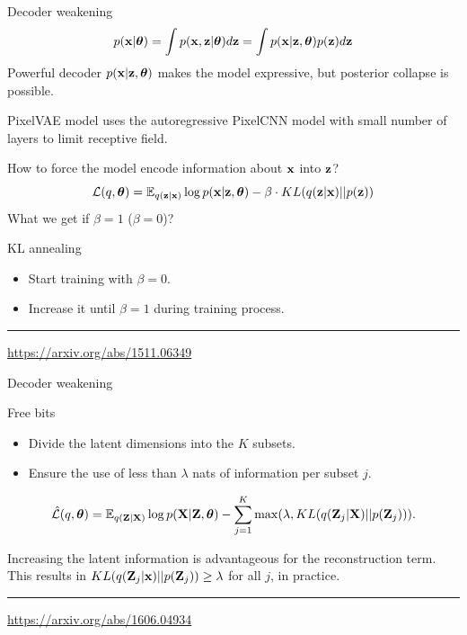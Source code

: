 \begin{frame}{Decoder weakening}
	\[
		p(\mathbf{x} | \boldsymbol{\theta}) = \int p(\mathbf{x}, \mathbf{z} | \boldsymbol{\theta}) d \mathbf{z} = \int p(\mathbf{x} | \mathbf{z}, \boldsymbol{\theta}) p(\mathbf{z}) d \mathbf{z} 
	\]
	Powerful decoder $p(\mathbf{x} | \mathbf{z}, \boldsymbol{\theta})$ makes the model expressive, but posterior collapse is possible.
	
	PixelVAE model uses the autoregressive PixelCNN model with small number of layers to limit receptive field.
	
	How to force the model encode information about $\mathbf{x}$ into $\mathbf{z}$?
	\[
	    \mathcal{L}(q, \boldsymbol{\theta}) = \mathbb{E}_{q(\mathbf{z} | \mathbf{x})} \log p(\mathbf{x} | \mathbf{z}, \boldsymbol{\theta}) - \beta \cdot KL (q(\mathbf{z} | \mathbf{x}) || p(\mathbf{z}))
	\]
	What we get if $\beta = 1$ ($\beta = 0$)? \\
	
	\begin{block}{KL annealing}
		\begin{itemize}
		    \item Start training with $\beta = 0$.
		    \item Increase it until $\beta = 1$ during training process.
		\end{itemize}
	\end{block}
	\vfill
	\hrule\medskip
	{\scriptsize \href{https://arxiv.org/abs/1511.06349}{https://arxiv.org/abs/1511.06349}}
\end{frame}
\begin{frame}{Decoder weakening}
\begin{block}{Free bits}
\begin{itemize}
\item Divide the latent dimensions into the $K$ subsets.
\item Ensure the use of less than $\lambda$ nats of information per subset $j$.
\end{itemize}

\[
    \hat{\mathcal{L}}(q, \boldsymbol{\theta}) = \mathbb{E}_{q(\mathbf{Z} | \mathbf{X})} \log p(\mathbf{X} | \mathbf{Z}, \boldsymbol{\theta}) - \sum_{j=1}^K \max(\lambda, KL (q(\mathbf{Z}_j | \mathbf{X}) || p(\mathbf{Z}_j))).
\]

Increasing the latent information is advantageous for the reconstruction term. \\
\vspace{0.2cm}
This results in $KL (q(\mathbf{Z}_j | \mathbf{x}) || p(\mathbf{Z}_j)) \geq \lambda$ for all $j$, in practice.
\end{block}
\vspace{1cm}
\vfill
\hrule\medskip
{\scriptsize \href{https://arxiv.org/abs/1606.04934}{https://arxiv.org/abs/1606.04934}}
\end{frame}
